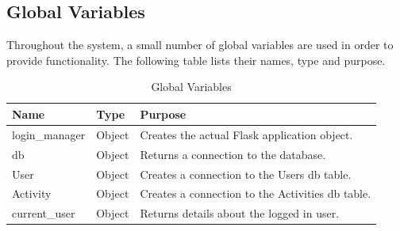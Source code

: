 \documentclass{article}[12pt,a4paper]
\begin{document}
\subsection{Global Variables}
Throughout the system, a small number of global variables are used in order to provide functionality. The following table lists their names, type and purpose.
\begin{table}[h]
\begin{tabular}{|l|l|l|}
\hline
\textbf{Name} & \textbf{Type} & \textbf{Purpose}                        \\ \hline
login\_manager                    & Object                 & Creates the actual Flask application object.     \\ \hline
db                     & Object                 & Returns a connection to the database.            \\ \hline
User                   & Object                 & Creates a connection to the Users db table.      \\ \hline
Activity               & Object                 & Creates a connection to the Activities db table. \\ \hline
current\_user          & Object                 & Returns details about the logged in user.        \\ \hline
\end{tabular}
\caption{Global Variables}
\end{table}
\end{document}
